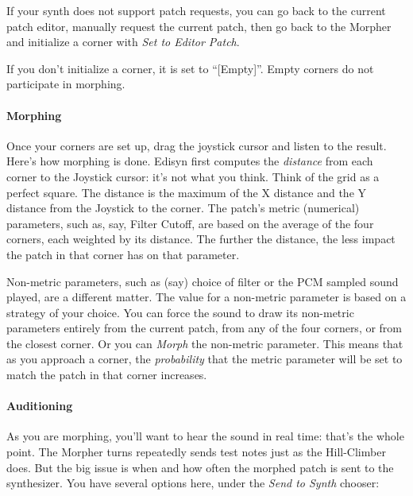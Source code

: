 \documentclass{article}
\begin{document}
If your synth does not support patch requests, you can go back to the current patch editor, manually request the current patch, then go back to the Morpher and initialize a corner with {\it Set to Editor Patch}.

If you don't initialize a corner, it is set to ``[Empty]''.  Empty corners do not participate in morphing.

\paragraph{Morphing} Once your corners are set up, drag the joystick cursor and listen to the result.  Here's how morphing is done.  Edisyn first computes the {\it distance} from each corner to the Joystick cursor: it's not what you think.  Think of the grid as a perfect square.  The distance is the maximum of the X distance and the Y distance from the Joystick to the corner.  The patch's metric (numerical) parameters, such as, say, Filter Cutoff, are based on the average of the four corners, each weighted by its distance.  The further the distance, the less impact the patch in that corner has on that parameter.

Non-metric parameters, such as (say) choice of filter or the PCM sampled sound played, are a different matter.  The value for a non-metric parameter is based on a strategy of your choice.  You can force the sound to draw its non-metric parameters entirely from  the current patch, from any of the four corners, or from the closest corner.  Or you can {\it Morph} the non-metric parameter.  This means that as you approach a corner, the {\it probability} that the metric parameter will be set to match the patch in that corner increases.  

\paragraph{Auditioning} As you are morphing, you'll want to hear the sound in real time: that's the whole point.  The Morpher turns repeatedly sends test notes just as the Hill-Climber does.   But the big issue is when and how often the morphed patch is sent to the synthesizer.  You have several options here, under the {\it Send to Synth} chooser:
\end{document}
